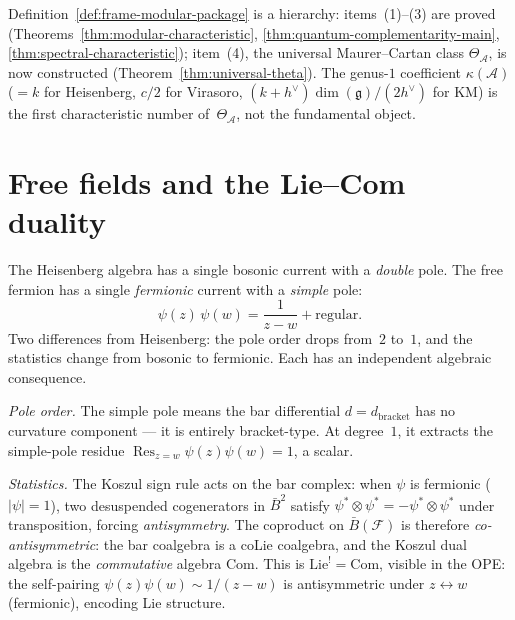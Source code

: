 \begin{remark}%
\label{rem:frame-kappa-not-fundamental}
Definition~\ref{def:frame-modular-package} is a hierarchy: items~(1)--(3) are proved (Theorems~\ref{thm:modular-characteristic}, \ref{thm:quantum-complementarity-main}, \ref{thm:spectral-characteristic}); item~(4), the universal Maurer--Cartan class $\Theta_{\mathcal{A}}$, is now constructed (Theorem~\ref{thm:universal-theta}).  The genus-$1$ coefficient $\kappa(\mathcal{A})$ ($= k$ for Heisenberg, $c/2$ for Virasoro, $(k+h^\vee)\dim(\mathfrak{g})/(2h^\vee)$ for KM) is the first characteristic number of~$\Theta_{\mathcal{A}}$, not the fundamental object.
\end{remark}

\section{Free fields and the Lie--Com duality}
\label{sec:frame-free-fields}

The Heisenberg algebra has a single bosonic current with a
\emph{double} pole.  The free fermion has a single
\emph{fermionic} current with a \emph{simple} pole:
\begin{equation}\label{eq:frame-fermion-ope}
\psi(z)\,\psi(w) = \frac{1}{z-w} + \text{regular}.
\end{equation}
Two differences from Heisenberg: the pole order drops from~$2$
to~$1$, and the statistics change from bosonic to fermionic.
Each has an independent algebraic consequence.

\emph{Pole order.}
The simple pole means the bar differential
$d = d_{\mathrm{bracket}}$ has no curvature component ---
it is entirely bracket-type.  At degree~$1$, it extracts the
simple-pole residue
$\operatorname{Res}_{z=w} \psi(z)\psi(w) = 1$, a scalar.

\emph{Statistics.}
The Koszul sign rule acts on the bar complex: when
$\psi$ is fermionic ($|\psi| = 1$), two desuspended
cogenerators in $\bar{B}^2$ satisfy
$\psi^* \otimes \psi^* = -\psi^* \otimes \psi^*$
under transposition, forcing \emph{antisymmetry}.
The coproduct on $\bar{B}(\mathcal{F})$ is therefore
\emph{co-antisymmetric}: the bar coalgebra is a coLie
coalgebra, and the Koszul dual algebra is the
\emph{commutative} algebra $\mathrm{Com}$.  This is
$\mathrm{Lie}^! = \mathrm{Com}$, visible in the OPE:
the self-pairing $\psi(z)\psi(w) \sim 1/(z-w)$ is
antisymmetric under $z \leftrightarrow w$ (fermionic),
encoding Lie structure.

